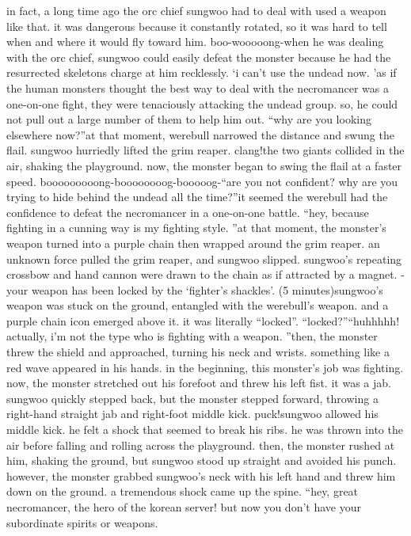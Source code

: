 in fact, a long time ago the orc chief sungwoo had to deal with used a weapon like that.
it was dangerous because it constantly rotated, so it was hard to tell when and where it would fly toward him.
boo-wooooong-when he was dealing with the orc chief, sungwoo could easily defeat the monster because he had the resurrected skeletons charge at him recklessly.
‘i can’t use the undead now.
’as if the human monsters thought the best way to deal with the necromancer was a one-on-one fight, they were tenaciously attacking the undead group.
 so, he could not pull out a large number of them to help him out.
“why are you looking elsewhere now?”at that moment, werebull narrowed the distance and swung the flail.
sungwoo hurriedly lifted the grim reaper.
clang!the two giants collided in the air, shaking the playground.
now, the monster began to swing the flail at a faster speed.
booooooooong-boooooooog-booooog-“are you not confident? why are you trying to hide behind the undead all the time?”it seemed the werebull had the confidence to defeat the necromancer in a one-on-one battle.
“hey, because fighting in a cunning way is my fighting style.
”at that moment, the monster’s weapon turned into a purple chain then wrapped around the grim reaper.
 an unknown force pulled the grim reaper, and sungwoo slipped.
sungwoo’s repeating crossbow and hand cannon were drawn to the chain as if attracted by a magnet.
-your weapon has been locked by the ‘fighter’s shackles’.
 (5 minutes)sungwoo’s weapon was stuck on the ground, entangled with the werebull’s weapon.
and a purple chain icon emerged above it.
 it was literally “locked”.
“locked?”“huhhhhh! actually, i’m not the type who is fighting with a weapon.
”then, the monster threw the shield and approached, turning his neck and wrists.
 something like a red wave appeared in his hands.
 in the beginning, this monster’s job was fighting.
now, the monster stretched out his forefoot and threw his left fist.
it was a jab.
 sungwoo quickly stepped back, but the monster stepped forward, throwing a right-hand straight jab and right-foot middle kick.
puck!sungwoo allowed his middle kick.
 he felt a shock that seemed to break his ribs.
 he was thrown into the air before falling and rolling across the playground.
then, the monster rushed at him, shaking the ground, but sungwoo stood up straight and avoided his punch.
 however, the monster grabbed sungwoo’s neck with his left hand and threw him down on the ground.
 a tremendous shock came up the spine.
“hey, great necromancer, the hero of the korean server! but now you don’t have your subordinate spirits or weapons.
